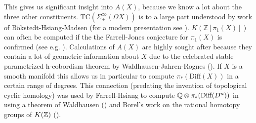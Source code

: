 This gives us significant insight into $A(X)$, because we know a lot about the three other constituents.
${\text{TC}(\Sigma^\infty_+(\Omega X))}$ is to a large part understood by work of Bökstedt-Hsiang-Madsen \cite{BHMtrace} (for a modern presentation see \cite[Section~IV.3]{NS}). 
$K(\mathbb{Z}[\pi_1(X)])$ can often be computed if the the Farrell-Jones conjecture for $\pi_1(X)$ is confirmed (see e.g. \cite{BartelsLückReich-FJC}). 
Calculations of $A(X)$ are highly sought after because they contain a lot of geometric information about $X$ due to the celebrated stable parametrized h-cobordism theorem by Waldhausen-Jahren-Rognes (\cite{WJR2013spaces}). If $X$ is a smooth manifold this allows us in particular to compute $\pi_*(\mathrm{Diff}(X))$ in a certain range of degrees. This connection (predating the invention of topological cyclic homology) was used by Farrell-Hsiang to compute $\mathbb{Q}\otimes\pi_*(\text{Diff}(D^n))$ in \cite{farrellhsiang1978rational} using a theorem of Waldhausen (\cite[Corollary~2.3.8]{waldhausen1985algebraic}) and Borel's work on the rational homotopy groups of $K(\mathbb{Z})$ (\cite[Chapter~12]{borel1974stable}).
